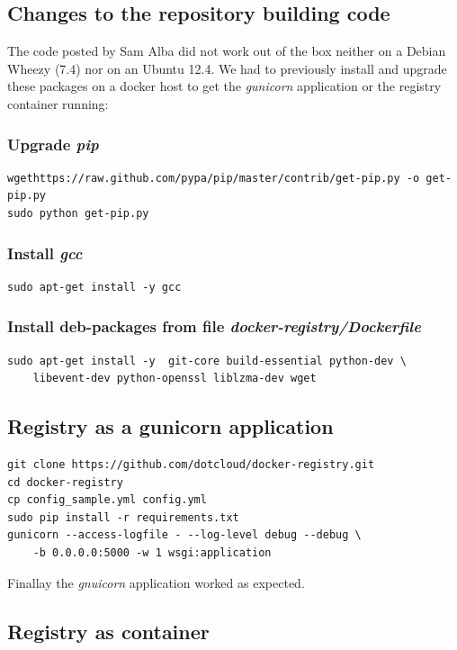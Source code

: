 \documentclass[11pt]{article}
\begin{document}
\subsection{Changes to the repository building code}
\label{sec-3-3}

The code posted by Sam Alba did not work out of the box neither on a Debian Wheezy (7.4) nor on an Ubuntu 12.4. We had to previously install and upgrade these packages on a docker host to get the \emph{gunicorn} application or the registry container running:
\subsubsection{Upgrade \emph{pip}}
\label{sec-3-3-1}


\begin{verbatim}
wgethttps://raw.github.com/pypa/pip/master/contrib/get-pip.py -o get-pip.py
sudo python get-pip.py
\end{verbatim}
\subsubsection{Install \emph{gcc}}
\label{sec-3-3-2}


\begin{verbatim}
sudo apt-get install -y gcc
\end{verbatim}
\subsubsection{Install deb-packages from file \emph{docker-registry/Dockerfile}}
\label{sec-3-3-3}


\begin{verbatim}
sudo apt-get install -y  git-core build-essential python-dev \
    libevent-dev python-openssl liblzma-dev wget
\end{verbatim}
\subsection{Registry as a  gunicorn application}
\label{sec-3-4}


\begin{verbatim}
git clone https://github.com/dotcloud/docker-registry.git
cd docker-registry
cp config_sample.yml config.yml
sudo pip install -r requirements.txt
gunicorn --access-logfile - --log-level debug --debug \
    -b 0.0.0.0:5000 -w 1 wsgi:application
\end{verbatim}
Finallay the \emph{gnuicorn} application worked as expected.
\subsection{Registry as container}
\label{sec-3-5}
\end{document}
